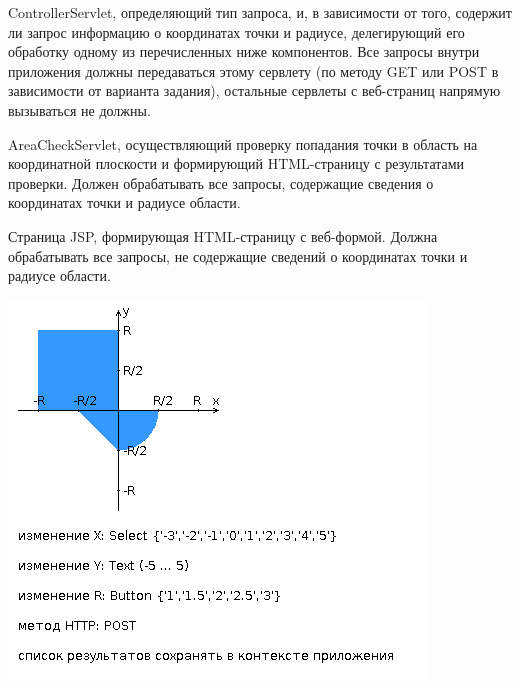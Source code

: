 \documentclass[a4paper, 12pt]{article}
\newenvironment{itemize*}%
  {\begin{itemize}%
    \setlength{\itemsep}{1pt}%
    \setlength{\parskip}{1pt}}%
  {\end{itemize}}
\begin{document}
\begin{itemize*}
\item ControllerServlet, определяющий тип запроса, и, в зависимости от того, содержит ли запрос информацию о координатах точки и радиусе, делегирующий его обработку одному из перечисленных ниже компонентов. Все запросы внутри приложения должны передаваться этому сервлету (по методу GET или POST в зависимости от варианта задания), остальные сервлеты с веб-страниц напрямую вызываться не должны.
\item AreaCheckServlet, осуществляющий проверку попадания точки в область на координатной плоскости и формирующий HTML-страницу с результатами проверки. Должен обрабатывать все запросы, содержащие сведения о координатах точки и радиусе области.
\item Страница JSP, формирующая HTML-страницу с веб-формой. Должна обрабатывать все запросы, не содержащие сведений о координатах точки и радиусе области.

\end{itemize*}

\includegraphics[scale=0.7]{img/areas.png}
\end{document}
